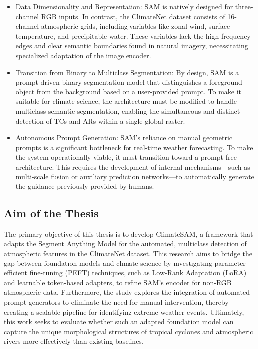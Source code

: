 \begin{itemize}
\item Data Dimensionality and Representation: SAM is natively designed for three-channel RGB inputs. In contrast, the ClimateNet dataset consists of 16-channel atmospheric grids, including variables like zonal wind, surface temperature, and precipitable water. These variables lack the high-frequency edges and clear semantic boundaries found in natural imagery, necessitating specialized adaptation of the image encoder.
\item Transition from Binary to Multiclass Segmentation: By design, SAM is a prompt-driven binary segmentation model that distinguishes a foreground object from the background based on a user-provided prompt. To make it suitable for climate science, the architecture must be modified to handle multiclass semantic segmentation, enabling the simultaneous and distinct detection of TCs and ARs within a single global raster.
\item Autonomous Prompt Generation: SAM's reliance on manual geometric prompts is a significant bottleneck for real-time weather forecasting. To make the system operationally viable, it must transition toward a prompt-free architecture. This requires the development of internal mechanisms—such as multi-scale fusion or auxiliary prediction networks—to automatically generate the guidance previously provided by humans.
\end{itemize}

\subsection{Aim of the Thesis}

The primary objective of this thesis is to develop ClimateSAM, a framework that adapts the Segment Anything Model for the automated, multiclass detection of atmospheric features in the ClimateNet dataset. This research aims to bridge the gap between foundation models and climate science by investigating parameter-efficient fine-tuning (PEFT) techniques, such as Low-Rank Adaptation (LoRA) and learnable token-based adapters, to refine SAM's encoder for non-RGB atmospheric data. Furthermore, the study explores the integration of automated prompt generators to eliminate the need for manual intervention, thereby creating a scalable pipeline for identifying extreme weather events. Ultimately, this work seeks to evaluate whether such an adapted foundation model can capture the unique morphological structures of tropical cyclones and atmospheric rivers more effectively than existing baselines.